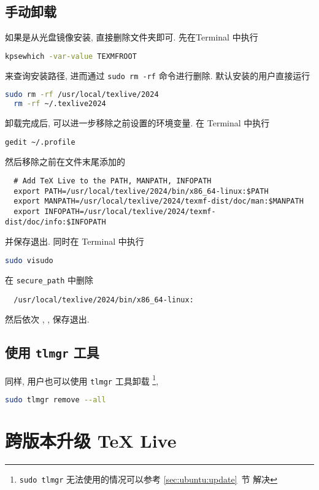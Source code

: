 \subsection{手动卸载}

如果是从光盘镜像安装,
直接删除文件夹即可.
先在\textsf{Terminal} 中执行
\begin{lstlisting}[language = bash]
  kpsewhich -var-value TEXMFROOT
\end{lstlisting}
来查询安装路径,
进而通过 \texttt{sudo rm -rf} 命令进行删除.
默认安装的用户直接运行
\begin{lstlisting}[language = bash]
  sudo rm -rf /usr/local/texlive/2024
  rm -rf ~/.texlive2024
\end{lstlisting}
卸载完成后, 可以进一步移除之前设置的环境变量.
在 \textsf{Terminal} 中执行
\begin{lstlisting}[language = bash]
  gedit ~/.profile
\end{lstlisting}
然后移除之前在文件末尾添加的
\begin{lstlisting}
  # Add TeX Live to the PATH, MANPATH, INFOPATH
  export PATH=/usr/local/texlive/2024/bin/x86_64-linux:$PATH
  export MANPATH=/usr/local/texlive/2024/texmf-dist/doc/man:$MANPATH
  export INFOPATH=/usr/local/texlive/2024/texmf-dist/doc/info:$INFOPATH
\end{lstlisting}
并保存退出.
同时在 \textsf{Terminal} 中执行
\begin{lstlisting}[language = bash]
  sudo visudo
\end{lstlisting}
在 \texttt{secure\_path} 中删除
\begin{lstlisting}
  /usr/local/texlive/2024/bin/x86_64-linux:
\end{lstlisting}
然后依次 , , \keys{\enter} 保存退出.

\subsection{使用 \texttt{tlmgr} 工具}

同样,
用户也可以使用 \texttt{tlmgr} 工具卸载%
\footnote{\texttt{sudo tlmgr} 无法使用的情况可以参考 \ref{sec:ubuntu:update}~节 解决},
\begin{lstlisting}[language=bash]
  sudo tlmgr remove --all
\end{lstlisting}

\section{跨版本升级 \TeX{} Live}\label{sec:ubuntu:version}


